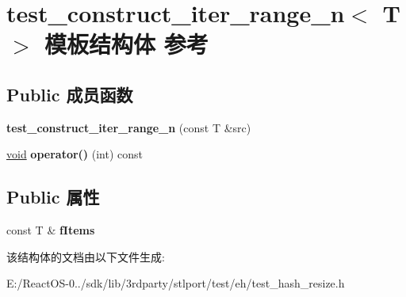 \hypertarget{structtest__construct__iter__range__n}{}\section{test\+\_\+construct\+\_\+iter\+\_\+range\+\_\+n$<$ T $>$ 模板结构体 参考}
\label{structtest__construct__iter__range__n}
\subsection*{Public 成员函数}
\begin{DoxyCompactItemize}
\item 
\mbox{\label{structtest__construct__iter__range__n_a70072c49bb364772a0ee52483d1d6ec3}} 
{\bfseries test\+\_\+construct\+\_\+iter\+\_\+range\+\_\+n} (const T \&src)
\item 
\mbox{\label{structtest__construct__iter__range__n_a7b98b389e71e6227238aa98d185e6bf0}} 
\hyperlink{interfacevoid}{void} {\bfseries operator()} (int) const
\end{DoxyCompactItemize}
\subsection*{Public 属性}
\begin{DoxyCompactItemize}
\item 
\mbox{\label{structtest__construct__iter__range__n_aaca470ec392cab4814813c4bf30600d1}} 
const T \& {\bfseries f\+Items}
\end{DoxyCompactItemize}


该结构体的文档由以下文件生成\+:\begin{DoxyCompactItemize}
\item 
E\+:/\+React\+O\+S-\/0../sdk/lib/3rdparty/stlport/test/eh/test\+\_\+hash\+\_\+resize.\+h\end{DoxyCompactItemize}
